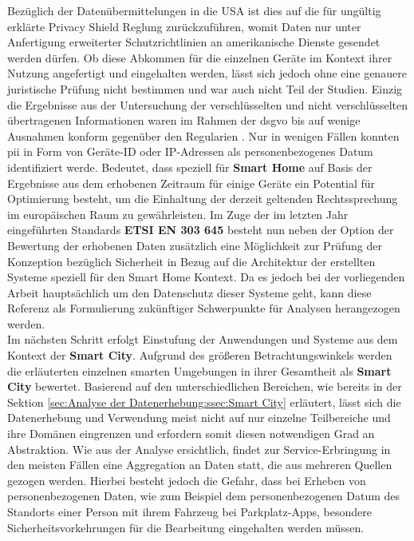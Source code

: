 Bezüglich der Datenübermittelungen in die USA ist dies auf die für ungültig erklärte Privacy Shield Reglung \cite{dsgvo2016} zurückzuführen, womit Daten nur unter Anfertigung erweiterter Schutzrichtlinien an amerikanische Dienste gesendet werden dürfen. Ob diese Abkommen für die einzelnen Geräte im Kontext ihrer Nutzung angefertigt und eingehalten werden, lässt sich jedoch ohne eine genauere juristische Prüfung nicht bestimmen und war auch nicht Teil der Studien. 
Einzig die Ergebnisse aus der Untersuchung der verschlüsselten und nicht verschlüsselten übertragenen Informationen waren im Rahmen der \ac{dsgvo} bis auf wenige Ausnahmen konform gegenüber den Regularien \cite{Ren2019}. Nur in wenigen Fällen konnten \ac{pii} in Form von Geräte-ID oder IP-Adressen als personenbezogenes Datum identifiziert werde.
Bedeutet, dass speziell für \textbf{Smart Home} auf Basis der Ergebnisse aus dem erhobenen Zeitraum für einige Geräte ein Potential für Optimierung besteht, um die Einhaltung der derzeit geltenden Rechtssprechung im europäischen Raum zu gewährleisten.
Im Zuge der im letzten Jahr eingeführten Standards \textbf{ETSI EN 303 645} \cite{Cyber2020} besteht nun neben der Option der Bewertung der erhobenen Daten zusätzlich eine Möglichkeit zur Prüfung der Konzeption bezüglich Sicherheit in Bezug auf die Architektur der erstellten Systeme speziell für den Smart Home Kontext. Da es jedoch bei der vorliegenden Arbeit hauptsächlich um den Datenschutz dieser Systeme geht, kann diese Referenz als Formulierung zukünftiger Schwerpunkte für Analysen herangezogen werden.\\
Im nächsten Schritt erfolgt Einstufung der Anwendungen und Systeme aus dem Kontext der \textbf{Smart City}. Aufgrund des größeren Betrachtungswinkels werden die erläuterten einzelnen smarten Umgebungen in ihrer Gesamtheit als \textbf{Smart City} bewertet. Basierend auf den unterschiedlichen Bereichen, wie bereits in der Sektion \ref{sec:Analyse der Datenerhebung:ssec:Smart City} erläutert, lässt sich die Datenerhebung und Verwendung meist nicht auf nur einzelne Teilbereiche und ihre Domänen eingrenzen und erfordern somit diesen notwendigen Grad an Abstraktion.
Wie aus der Analyse \cite{BCG2020} ersichtlich, findet zur Service-Erbringung in den meisten Fällen eine Aggregation an Daten statt, die aus mehreren Quellen gezogen werden. Hierbei besteht jedoch die Gefahr, dass bei Erheben von personenbezogenen Daten, wie zum Beispiel dem personenbezogenen Datum des Standorts einer Person mit ihrem Fahrzeug bei Parkplatz-Apps, besondere Sicherheitsvorkehrungen für die Bearbeitung eingehalten werden müssen.

